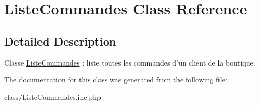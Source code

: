 \hypertarget{class_liste_commandes}{
\section{ListeCommandes Class Reference}
\label{class_liste_commandes}
}


\subsection{Detailed Description}
Classe \hyperlink{class_liste_commandes}{ListeCommandes} : liste toutes les commandes d'un client de la boutique. 

The documentation for this class was generated from the following file:\begin{DoxyCompactItemize}
\item 
class/ListeCommandes.inc.php\end{DoxyCompactItemize}
